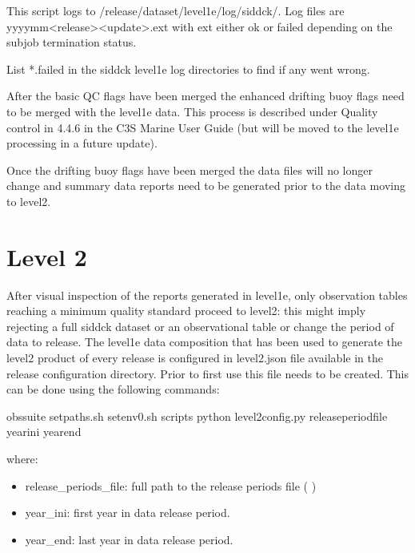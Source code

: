 \documentclass[letterpaper,10pt,english]{sphinxmanual}
\begin{document}
This script logs to /release/dataset/level1e/log/sid\sphinxhyphen{}dck/. Log files
are yyyy\sphinxhyphen{}mm\sphinxhyphen{}\textless{}release\textgreater{}\sphinxhyphen{}\textless{}update\textgreater{}.ext with ext either ok or failed depending on the
subjob termination status.

List  *.failed in the sid\sphinxhyphen{}dck level1e log directories to find if any went wrong.

After the basic QC flags have been merged the enhanced drifting buoy flags need
to be merged with the level1e data. This process is described under Quality
control in 4.4.6 in the C3S Marine User Guide (but will be moved to the level1e
processing in a future update).

Once the drifting buoy flags have been merged the data files will no longer
change and summary data reports need to be generated prior to the data moving to
level2.


\chapter{Level 2}
\label{\detokenize{index:level-2}}
After visual inspection of the reports generated in level1e, only observation
tables reaching a minimum quality standard proceed to level2: this might imply
rejecting a full sid\sphinxhyphen{}dck dataset or an observational table or change the period
of data to release. The level1e data composition that has been used to generate
the level2 product of every release is configured in level2.json file available
in the release configuration directory. Prior to first use this file needs to be
created. This can be done using the following commands:

\begin{sphinxVerbatim}[commandchars=\\\{\}]
 obs\PYGZhy{}suite
 setpaths.sh
 setenv0.sh
 scripts
python level2\PYGZus{}config.py release\PYGZus{}period\PYGZus{}file year\PYGZus{}ini year\PYGZus{}end
\end{sphinxVerbatim}

where:
\begin{itemize}
\item {} 
release\_periods\_file: full path to the release periods file ( {\hyperref[\detokenize{index:release-periods-file}]{}} )

\item {} 
year\_ini: first year in data release period.

\item {} 
year\_end: last year in data release period.

\end{itemize}
\end{document}
